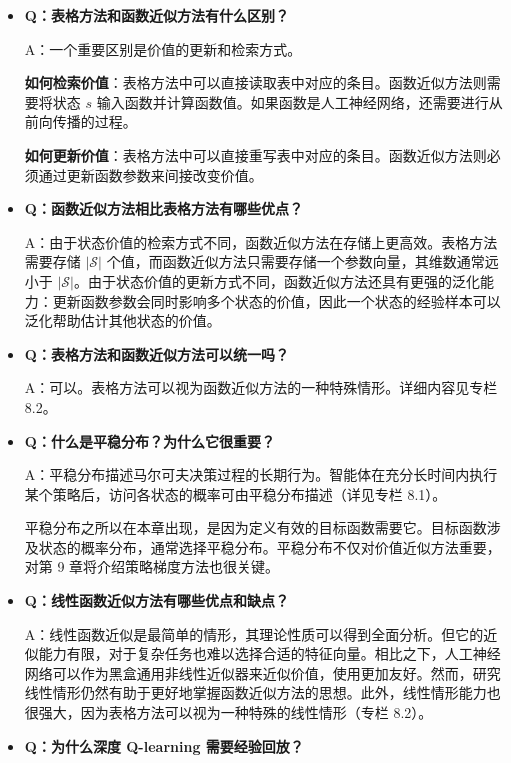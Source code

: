 \documentclass[UTF8]{article}
\begin{document}
\begin{itemize}
    \item \textbf{Q：表格方法和函数近似方法有什么区别？}
    
    A：一个重要区别是价值的更新和检索方式。
    
    \textbf{如何检索价值}：表格方法中可以直接读取表中对应的条目。函数近似方法则需要将状态 $s$ 输入函数并计算函数值。如果函数是人工神经网络，还需要进行从前向传播的过程。
    
    \textbf{如何更新价值}：表格方法中可以直接重写表中对应的条目。函数近似方法则必须通过更新函数参数来间接改变价值。

    \item \textbf{Q：函数近似方法相比表格方法有哪些优点？}
    
    A：由于状态价值的检索方式不同，函数近似方法在存储上更高效。表格方法需要存储 $|\mathcal{S}|$ 个值，而函数近似方法只需要存储一个参数向量，其维数通常远小于 $|\mathcal{S}|$。由于状态价值的更新方式不同，函数近似方法还具有更强的泛化能力：更新函数参数会同时影响多个状态的价值，因此一个状态的经验样本可以泛化帮助估计其他状态的价值。

    \item \textbf{Q：表格方法和函数近似方法可以统一吗？}
    
    A：可以。表格方法可以视为函数近似方法的一种特殊情形。详细内容见专栏 8.2。

    \item \textbf{Q：什么是平稳分布？为什么它很重要？}
    
    A：平稳分布描述马尔可夫决策过程的长期行为。智能体在充分长时间内执行某个策略后，访问各状态的概率可由平稳分布描述（详见专栏 8.1）。
    
    平稳分布之所以在本章出现，是因为定义有效的目标函数需要它。目标函数涉及状态的概率分布，通常选择平稳分布。平稳分布不仅对价值近似方法重要，对第 9 章将介绍策略梯度方法也很关键。

    \item \textbf{Q：线性函数近似方法有哪些优点和缺点？}
    
    A：线性函数近似是最简单的情形，其理论性质可以得到全面分析。但它的近似能力有限，对于复杂任务也难以选择合适的特征向量。相比之下，人工神经网络可以作为黑盒通用非线性近似器来近似价值，使用更加友好。然而，研究线性情形仍然有助于更好地掌握函数近似方法的思想。此外，线性情形能力也很强大，因为表格方法可以视为一种特殊的线性情形（专栏 8.2）。

    \item \textbf{Q：为什么深度 Q-learning 需要经验回放？}
    

\end{itemize}
\end{document}
